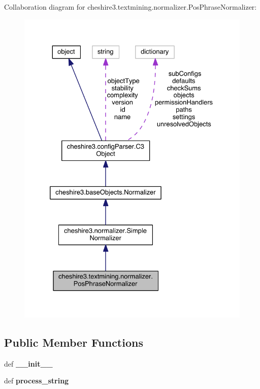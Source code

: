 Collaboration diagram for cheshire3.\-textmining.\-normalizer.\-Pos\-Phrase\-Normalizer\-:
\nopagebreak
\begin{figure}[H]
\begin{center}
\leavevmode
\includegraphics[width=328pt]{classcheshire3_1_1textmining_1_1normalizer_1_1_pos_phrase_normalizer__coll__graph}
\end{center}
\end{figure}
\subsection*{Public Member Functions}
\begin{DoxyCompactItemize}
\item 
\hypertarget{classcheshire3_1_1textmining_1_1normalizer_1_1_pos_phrase_normalizer_a5912f64395b5b856f4aef5b06c74597e}{def {\bfseries \-\_\-\-\_\-init\-\_\-\-\_\-}}\label{classcheshire3_1_1textmining_1_1normalizer_1_1_pos_phrase_normalizer_a5912f64395b5b856f4aef5b06c74597e}

\item 
\hypertarget{classcheshire3_1_1textmining_1_1normalizer_1_1_pos_phrase_normalizer_a598a9b0072341b2cd94350db2ec0f283}{def {\bfseries process\-\_\-string}}\label{classcheshire3_1_1textmining_1_1normalizer_1_1_pos_phrase_normalizer_a598a9b0072341b2cd94350db2ec0f283}

\end{DoxyCompactItemize}
